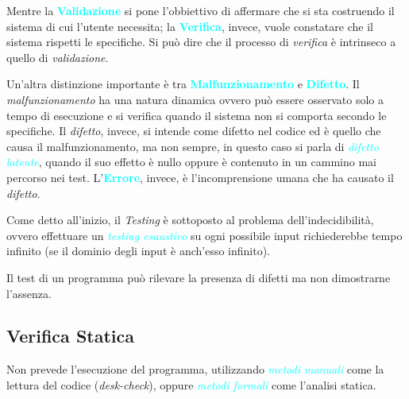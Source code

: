 Mentre la \textbf{\textcolor{cyan}{Validazione}} si pone l'obbiettivo di affermare
che si sta costruendo il sistema di cui l'utente necessita; la \textbf{\textcolor{cyan}{Verifica}},
invece, vuole constatare che il sistema rispetti le specifiche. Si può
dire che il processo di \emph{verifica} è intrinseco a quello di \emph{validazione}.

Un'altra distinzione importante è tra \textbf{\textcolor{cyan}{Malfunzionamento}}
e \textbf{\textcolor{cyan}{Difetto}}. Il \emph{malfunzionamento} ha una natura dinamica
ovvero può essere osservato solo a tempo di esecuzione e si verifica quando il sistema non
si comporta secondo le specifiche. Il \emph{difetto}, invece, si intende come difetto nel
codice ed è quello che causa il malfunzionamento, ma non sempre, in questo caso si parla
di \emph{\textcolor{cyan}{difetto latente}}, quando il suo effetto è nullo oppure è
contenuto in un cammino mai percorso nei test.
L'\textbf{\textcolor{cyan}{Errore}}, invece, è l'incomprensione umana che ha causato
il \emph{difetto}.

Come detto all'inizio, il \emph{Testing} è sottoposto al problema
dell'indecidibilità, ovvero effettuare un \emph{\textcolor{cyan}{testing esaustivo}}
su ogni possibile input richiederebbe tempo infinito (se il dominio degli input è anch'esso infinito).

\begin{definition}
    Il test di un programma può rilevare la presenza di difetti ma non
    dimostrarne l'assenza.
\end{definition}

\subsection{Verifica Statica}

Non prevede l'esecuzione del programma, utilizzando \emph{\textcolor{cyan}{metodi manuali}} come
la lettura del codice (\emph{desk-check}), oppure \emph{\textcolor{cyan}{metodi formali}} come l'analisi
statica.

